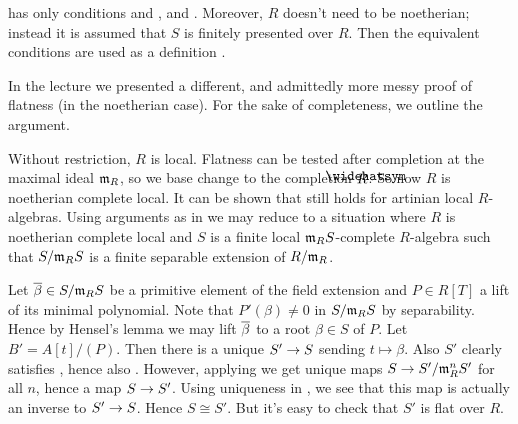 \documentclass[a4paper, 10pt, oneside, DIV=9, chapterprefix=true, numbers=enddot, bibliography=totoc]{scrbook}
\begin{document}
\begin{rem}
	\cite[Arcata]{sga4.5} has only conditions  and , and . Moreover, $R$ doesn't need to be noetherian; instead it is assumed that $S$ is finitely presented over $R$. Then the equivalent conditions are used as a definition .
\end{rem}
\begin{rem*}
	In the lecture we presented a different, and admittedly more messy proof of flatness (in the noetherian case). For the sake of completeness, we outline the argument.
	
	Without restriction, $R$ is local. Flatness can be tested after completion at the maximal ideal $\mathfrak{m}_R$, so we base change to the completion $\roof{R}$. So now $R$ is noetherian complete local. It can be shown that  still holds for artinian local $R$-algebras. Using arguments as in \cite[15--17]{jacobians} we may reduce to a situation where $R$ is noetherian complete local and $S$ is a finite local $\mathfrak{m}_RS$-complete $R$-algebra such that $S/\mathfrak{m}_RS$ is a finite separable extension of $R/\mathfrak{m}_R$.
	
	Let $\ov{\beta}\in S/\mm_RS$ be a primitive element of the field extension and $P\in R[T]$ a lift of its minimal polynomial. Note that $P'(\beta)\neq 0$ in $S/\mathfrak{m}_RS$ by separability. Hence by Hensel's lemma we may lift $\ov{\beta}$ to a root $\beta\in S$ of $P$. Let $B'=A[t]/(P)$. Then there is a unique $S'\morphism S$ sending $t\mapsto \beta$. Also $S'$ clearly satisfies , hence also . However, applying  we get unique maps $S\morphism S'/\mm_R^nS'$ for all $n$, hence a map $S\morphism S'$. Using uniqueness in , we see that this map is actually an inverse to $S'\morphism S$. Hence $S\cong S'$. But it's easy to check that $S'$ is flat over $R$.
\end{rem*}
\end{document}
